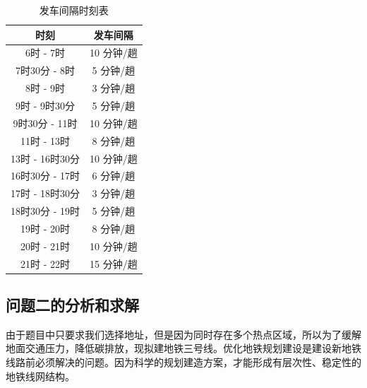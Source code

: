 \documentclass[12pt,a4paper]{mcmthesis}
\begin{document}
    \begin{table}[h]
        \centering
        \caption{发车间隔时刻表}
        \label{tab:p1_interval}
        \begin{tabular}{c|c}
            \hline
            时刻           & 发车间隔    \\ \hline
            6时 - 7时      & 10 分钟/趟 \\
            7时30分 - 8时   & 5 分钟/趟  \\
            8时 - 9时      & 3 分钟/趟  \\
            9时 - 9时30分   & 5 分钟/趟  \\
            9时30分 - 11时  & 10 分钟/趟 \\
            11时 - 13时    & 8 分钟/趟  \\
            13时 - 16时30分 & 10 分钟/趟 \\
            16时30分 - 17时 & 6 分钟/趟  \\
            17时 - 18时30分 & 3 分钟/趟  \\
            18时30分 - 19时 & 5 分钟/趟  \\
            19时 - 20时    & 8 分钟/趟  \\
            20时 - 21时    & 10 分钟/趟 \\
            21时 - 22时    & 15 分钟/趟 \\
        \end{tabular}
    \end{table}

    \subsection{问题二的分析和求解}
    由于题目中只要求我们选择地址，但是因为同时存在多个热点区域，所以为了缓解地面交通压力，降低碳排放，现拟建地铁三号线。优化地铁规划建设是建设新地铁线路前必须解决的问题。因为科学的规划建造方案，才能形成有层次性、稳定性的地铁线网结构。
\end{document}
